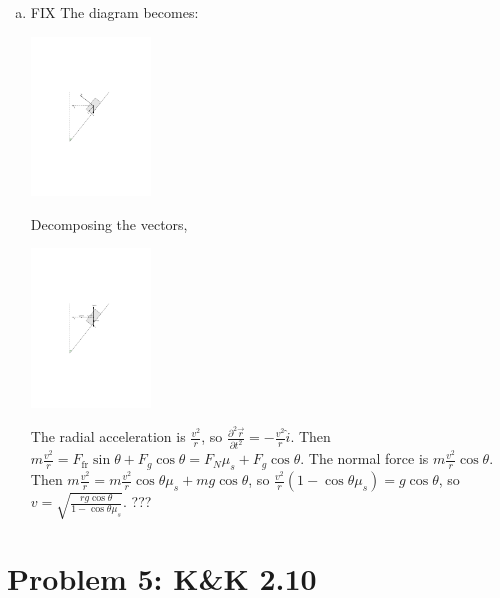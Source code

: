 \documentclass[solutions]{esg8012pset}
\begin{document}
\begin{enumerate}[a)]
    \item FIX The diagram becomes: \begin{center}\includegraphics[width=0.25\textwidth]{2009-09-25_Diagram_8}\end{center}  Decomposing the vectors, \begin{center}\includegraphics[width=0.25\textwidth]{2009-09-25_Diagram_9}\end{center}  The radial acceleration is $\frac{v^2}{r}$, so $\frac{\partial^2 \vec r}{\partial t^2} = -\frac{v^2}{r}\hat i$.  Then $m\frac{v^2}{r} = F_{\text{fr}}\sin\theta + F_g\cos\theta = F_N \mu_s + F_g\cos\theta$.  The normal force is $m\frac{v^2}{r}\cos\theta$.  Then $m\frac{v^2}{r} = m\frac{v^2}{r}\cos\theta \mu_s + mg\cos\theta$, so $\frac{v^2}{r}(1 - \cos\theta \mu_s) = g\cos\theta$, so $v = \sqrt{\frac{rg\cos\theta}{1-\cos\theta\mu_s}}$. ???
  \end{enumerate}

  \noindent
\section*{Problem 5: K\&K 2.10}
\end{document}

